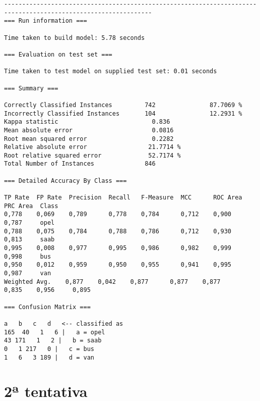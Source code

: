 \documentclass[
	article,			%
	11pt,				%
	oneside,			%
	a4paper,			%
	english,			%
	brazil,				%
	sumario=tradicional
	]{abntex2}
\begin{document}
\begin{lstlisting}
---------------------------------------------------------------------------------------------------------------
=== Run information ===

Time taken to build model: 5.78 seconds

=== Evaluation on test set ===

Time taken to test model on supplied test set: 0.01 seconds

=== Summary ===

Correctly Classified Instances         742               87.7069 %
Incorrectly Classified Instances       104               12.2931 %
Kappa statistic                          0.836 
Mean absolute error                      0.0816
Root mean squared error                  0.2282
Relative absolute error                 21.7714 %
Root relative squared error             52.7174 %
Total Number of Instances              846     

=== Detailed Accuracy By Class ===

TP Rate  FP Rate  Precision  Recall   F-Measure  MCC      ROC Area  PRC Area  Class
0,778    0,069    0,789      0,778    0,784      0,712    0,900     0,787     opel
0,788    0,075    0,784      0,788    0,786      0,712    0,930     0,813     saab
0,995    0,008    0,977      0,995    0,986      0,982    0,999     0,998     bus
0,950    0,012    0,959      0,950    0,955      0,941    0,995     0,987     van
Weighted Avg.    0,877    0,042    0,877      0,877    0,877      0,835    0,956     0,895     

=== Confusion Matrix ===

a   b   c   d   <-- classified as
165  40   1   6 |   a = opel
43 171   1   2 |   b = saab
0   1 217   0 |   c = bus
1   6   3 189 |   d = van

\end{lstlisting}

\newpage

\section{2ª tentativa}
\end{document}
